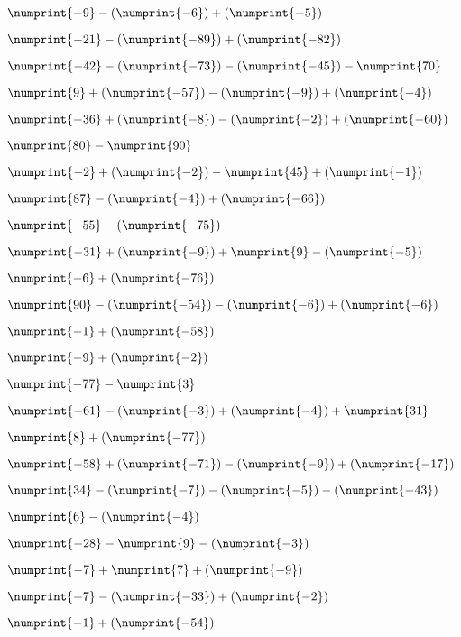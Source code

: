 {{\item$\numprint{-9} - (\numprint{-6}) + (\numprint{-5})$  \item$\numprint{-21} - (\numprint{-89}) + (\numprint{-82})$  \item$\numprint{-42} - (\numprint{-73}) - (\numprint{-45}) - \numprint{70}$

\item$\numprint{9} + (\numprint{-57}) - (\numprint{-9}) + (\numprint{-4})$  \item$\numprint{-36} + (\numprint{-8}) - (\numprint{-2}) + (\numprint{-60})$  \item$\numprint{80} - \numprint{90}$

\item$\numprint{-2} + (\numprint{-2}) - \numprint{45} + (\numprint{-1})$  \item$\numprint{87} - (\numprint{-4}) + (\numprint{-66})$  \item$\numprint{-55} - (\numprint{-75})$

\item$\numprint{-31} + (\numprint{-9}) + \numprint{9} - (\numprint{-5})$  \item$\numprint{-6} + (\numprint{-76})$  \item$\numprint{90} - (\numprint{-54}) - (\numprint{-6}) + (\numprint{-6})$

\item$\numprint{-1} + (\numprint{-58})$  \item$\numprint{-9} + (\numprint{-2})$  \item$\numprint{-77} - \numprint{3}$

\item$\numprint{-61} - (\numprint{-3}) + (\numprint{-4}) + \numprint{31}$  \item$\numprint{8} + (\numprint{-77})$  \item$\numprint{-58} + (\numprint{-71}) - (\numprint{-9}) + (\numprint{-17})$

\item$\numprint{34} - (\numprint{-7}) - (\numprint{-5}) - (\numprint{-43})$  \item$\numprint{6} - (\numprint{-4})$  \item$\numprint{-28} - \numprint{9} - (\numprint{-3})$

\item$\numprint{-7} + \numprint{7} + (\numprint{-9})$  \item$\numprint{-7} - (\numprint{-33}) + (\numprint{-2})$  \item$\numprint{-1} + (\numprint{-54})$

}}

